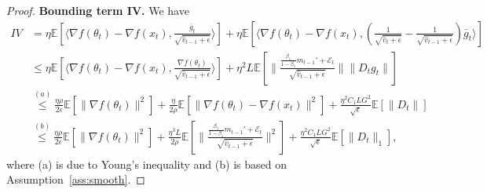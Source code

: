 \documentclass[11pt]{article}
\begin{document}
\begin{proof}
\textbf{Bounding term IV.} We have
\begin{align}
    IV&=\eta\mathbb E[\langle \nabla f(\theta_t)-\nabla f(x_t), \frac{\bar g_t}{\sqrt{\hat v_{t-1}+\epsilon}} \rangle]+\eta\mathbb E[\langle \nabla f(\theta_t)-\nabla f(x_t), (\frac{1}{\sqrt{\hat v_t+\epsilon}}-\frac{1}{\sqrt{\hat v_{t-1}+\epsilon}})\bar g_t \rangle] \nonumber\\
    &\leq \eta\mathbb E[\langle \nabla f(\theta_t)-\nabla f(x_t), \frac{\nabla f(\theta_t)}{\sqrt{\hat v_{t-1}+\epsilon}} \rangle]+\eta^2 L\mathbb E[\|\frac{\frac{\beta_1}{1-\beta_1}m_{t-1}'+\mathcal E_t}{\sqrt{\hat v_{t-1}+\epsilon}}\|\|D_t g_t\|] \nonumber\\
    &\overset{(a)}{\leq} \frac{\eta \rho}{2\epsilon}\mathbb E[\|\nabla f(\theta_t)\|^2]+\frac{\eta}{2\rho}\mathbb E[\|\nabla f(\theta_t)-\nabla f(x_t)\|^2]+\frac{\eta^2 C_1LG^2}{\sqrt\epsilon} \mathbb E[\|D_t\|]  \nonumber\\
    &\overset{(b)}{\leq} \frac{\eta \rho}{2\epsilon}\mathbb E[\|\nabla f(\theta_t)\|^2]+\frac{\eta^3 L}{2\rho}\mathbb E[\|\frac{\frac{\beta_1}{1-\beta_1}m_{t-1}'+\mathcal E_t}{\sqrt{\hat v_{t-1}+\epsilon}}\|^2]+\frac{\eta^2 C_1LG^2}{\sqrt\epsilon} \mathbb E[\|D_t\|_1],  \label{eq:IV}
\end{align}
where (a) is due to Young's inequality and (b) is based on Assumption~\ref{ass:smooth}.


\end{proof}
\end{document}
